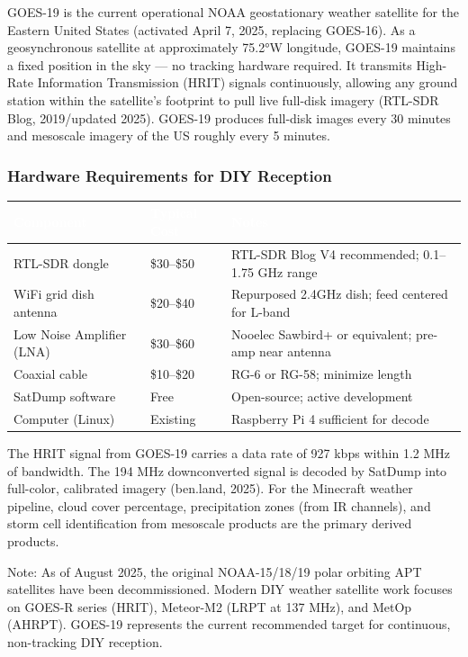 \documentclass[11pt,letterpaper]{article}
\newcommand{\tableheader}[1]{\textbf{\sffamily\textcolor{white}{#1}}}
\begin{document}
GOES-19 is the current operational NOAA geostationary weather satellite for the Eastern United States (activated April 7, 2025, replacing GOES-16). As a geosynchronous satellite at approximately 75.2°W longitude, GOES-19 maintains a fixed position in the sky --- no tracking hardware required. It transmits High-Rate Information Transmission (HRIT) signals continuously, allowing any ground station within the satellite's footprint to pull live full-disk imagery (RTL-SDR Blog, 2019/updated 2025). GOES-19 produces full-disk images every 30 minutes and mesoscale imagery of the US roughly every 5 minutes.

\subsubsection{Hardware Requirements for DIY Reception}

\begin{center}
\begin{tabularx}{\textwidth}{L{3.5cm}L{3cm}X}
\toprule
{}
\tableheader{Component} & \tableheader{Typical Cost} & \tableheader{Notes} \\
\midrule
RTL-SDR dongle & \$30--\$50 & RTL-SDR Blog V4 recommended; 0.1--1.75 GHz range \\
WiFi grid dish antenna & \$20--\$40 & Repurposed 2.4GHz dish; feed centered for L-band \\
Low Noise Amplifier (LNA) & \$30--\$60 & Nooelec Sawbird+ or equivalent; pre-amp near antenna \\
Coaxial cable & \$10--\$20 & RG-6 or RG-58; minimize length \\
SatDump software & Free & Open-source; active development \\
Computer (Linux) & Existing & Raspberry Pi 4 sufficient for decode \\
\bottomrule
\end{tabularx}
\end{center}

The HRIT signal from GOES-19 carries a data rate of 927 kbps within 1.2 MHz of bandwidth. The 194 MHz downconverted signal is decoded by SatDump into full-color, calibrated imagery (ben.land, 2025). For the Minecraft weather pipeline, cloud cover percentage, precipitation zones (from IR channels), and storm cell identification from mesoscale products are the primary derived products.

Note: As of August 2025, the original NOAA-15/18/19 polar orbiting APT satellites have been decommissioned. Modern DIY weather satellite work focuses on GOES-R series (HRIT), Meteor-M2 (LRPT at 137 MHz), and MetOp (AHRPT). GOES-19 represents the current recommended target for continuous, non-tracking DIY reception.
\end{document}
